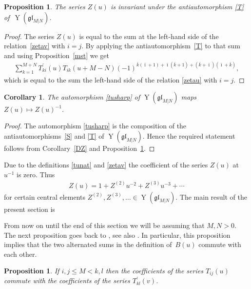 \documentclass[10pt,a4paper]{amsart}
\numberwithin{equation}{section}
\newtheorem{Corollary}[Theorem]{Corollary}
\newtheorem{Proposition}[Theorem]{Proposition}
\def\bi{{\bar\imath }}
\def\bk{{\bar k }}
\def\glMN{\mathfrak{gl}_{M|N}}
\def\le{\leqslant}
\def\TP{T^{\prime}}
\def\YMN{\operatorname{Y}(\glMN)}
\begin{document}
\begin{Proposition}\label{TZ}The series $Z(u)$ is invariant under the antiautomorphism \eqref{T}
of~$\YMN $.
\end{Proposition}

\begin{proof}
The series $Z(u)$ is equal to the sum at the left-hand side of
the relation~\eqref{zetav} with $i=j $. By applying
the antiautomorphism~\eqref{T} to that sum and using Proposition~\ref{mst}
we get
\begin{gather*}
\sum_{k=1}^{M+N}
\TP_{ki}(u) T_{ik}(u+M-N)
{(-1)}^{\bk( \bi + 1) + \bi ( \bk + 1) +
( \bk + \bi )( \bi + \bk )},
\end{gather*}
which is equal
to the sum the left-hand side of the relation \eqref{zetau} with $i=j $.
\end{proof}

\begin{Corollary}\label{STZ}The automorphism \eqref{tusharp} of $\YMN$ maps $Z(u)\mapsto Z(u)^{-1} $.
\end{Corollary}

\begin{proof}The automorphism \eqref{tusharp} is the composition of the antiautomorphisms~\eqref{S} and \eqref{T} of $\YMN $. Hence the required statement follows from Corollary~\ref{DZ} and Proposition~\ref{TZ}.
\end{proof}

Due to the definitions \eqref{tunat} and \eqref{zetav}
the coefficient of the series $Z(u)$ at $u^{-1}$ is zero. Thus
\begin{gather}\label{zud}
Z(u)=1+Z^{(2)} u^{-2}+Z^{(3)} u^{-3}+\cdots
\end{gather}
for certain central elements $Z^{(2)},Z^{(3)},\ldots\in\YMN $.
The main result of the present section is

From now on until the end of this section
we will be assuming that $M,N>0 $.
The next proposition goes back to \cite[Theorem~2.4]{C}, see also
\cite[Section~1]{G2}.
In particular, this proposition implies
that the two alternated sums in the definition of~$B(u)$ commute with each other.

\begin{Proposition}\label{L3}
If $i,j\le M<k,l$ then the coefficients of the series
$T_{ij}(u)$ commute with the coefficients of the series $\TP_{kl}(v) $.
\end{Proposition}
\end{document}
